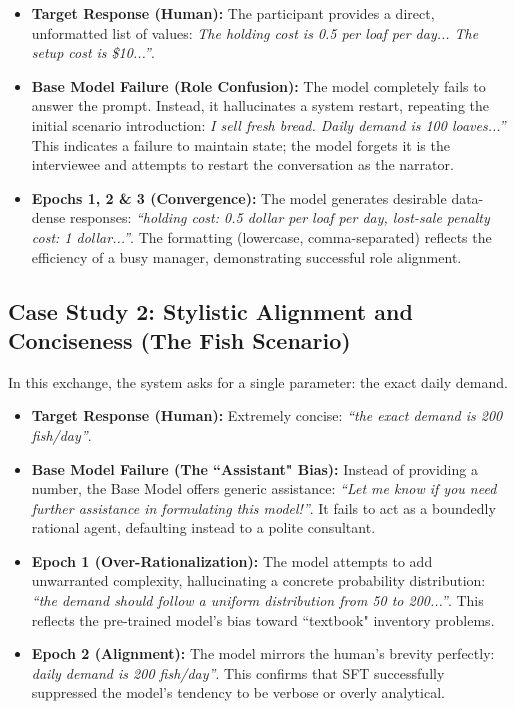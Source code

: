         \begin{itemize}
            \item \textbf{Target Response (Human):} The participant provides a direct, unformatted list of values: \emph{The holding cost is 0.5 per loaf per day... The setup cost is \$10...''}. 
            \item \textbf{Base Model Failure (Role Confusion):} The model completely fails to answer the prompt. Instead, it hallucinates a system restart, repeating the initial scenario introduction: \emph{I sell fresh bread. Daily demand is 100 loaves...''} 
            This indicates a failure to maintain state; the model forgets it is the interviewee and attempts to restart the conversation as the narrator.
            \item \textbf{Epochs 1, 2 \& 3 (Convergence):} The model generates desirable data-dense responses: \emph{``holding cost: 0.5 dollar per loaf per day, lost-sale penalty cost: 1 dollar...''}. The formatting (lowercase, comma-separated) reflects the efficiency of a busy manager, demonstrating successful role alignment.
        \end{itemize}
            
        \subsection*{Case Study 2: Stylistic Alignment and Conciseness (The Fish Scenario)}\label{app:case_fish}
        In this exchange, the system asks for a single parameter: the exact daily demand.
        \begin{itemize}
            \item \textbf{Target Response (Human):} Extremely concise: \emph{``the exact demand is 200 fish/day''}. 
            \item \textbf{Base Model Failure (The ``Assistant" Bias):} Instead of providing a number, the Base Model offers generic assistance: \emph{``Let me know if you need further assistance in formulating this model!''}. It fails to act as a boundedly rational agent, defaulting instead to a polite consultant.
            \item \textbf{Epoch 1 (Over-Rationalization):} The model attempts to add unwarranted complexity, hallucinating a concrete probability distribution: \emph{``the demand should follow a uniform distribution from 50 to 200...''}. This reflects the pre-trained model's bias toward ``textbook" inventory problems. 
            \item \textbf{Epoch 2 (Alignment):} The model mirrors the human's brevity perfectly: \emph{daily demand is 200 fish/day''}. This confirms that SFT successfully suppressed the model's tendency to be verbose or overly analytical.
        \end{itemize}
        
